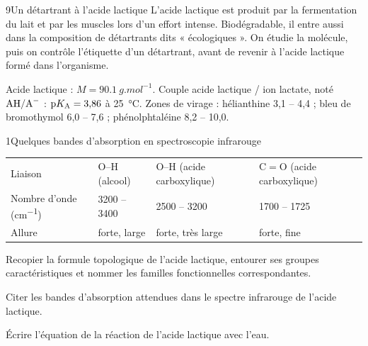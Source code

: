 

\begin{exoBac}{9}{Un détartrant à l'acide lactique}
L'acide lactique est produit par la fermentation du lait et par les muscles lors d'un effort intense. Biodégradable, il
entre aussi dans la composition de détartrants dits « écologiques ». On étudie la molécule, puis on contrôle
l'étiquette d'un détartrant, avant de revenir à l'acide lactique formé dans l'organisme.
\begin{donnees}
Acide lactique : $M=\qty{90,1}{g.mol^{-1}}$. Couple acide lactique / ion lactate, noté $\ce{AH}/\ce{A-}$ : $\mathrm{p}K_{\mathrm{A}}=3{,}86$ à
\qty{25}{\degreeCelsius}. Zones de virage : hélianthine 3,1 -- 4,4 ; bleu de bromothymol 6,0 -- 7,6 ; phénolphtaléine 8,2 -- 10,0.
\end{donnees}

\begin{center}
\par\smallskip
{}
\end{center}
\begin{docu}{1}{Quelques bandes d'absorption en spectroscopie infrarouge}
{\small\begin{tabular}{@{}llll@{}}
Liaison & O--H (alcool) & O--H (acide carboxylique) & C$=$O (acide carboxylique) \\
Nombre d'onde (\unit{cm^{-1}}) & 3200 -- 3400 & 2500 -- 3200 & 1700 -- 1725 \\
Allure & forte, large & forte, très large & forte, fine \\
\end{tabular}}
\end{docu}
\begin{questions}
\item Recopier la formule topologique de l'acide lactique, entourer ses groupes caractéristiques et nommer les familles
fonctionnelles correspondantes.
\item Citer les bandes d'absorption attendues dans le spectre infrarouge de l'acide lactique.
\item Écrire l'équation de la réaction de l'acide lactique avec l'eau.
\end{questions}


\end{exoBac}
